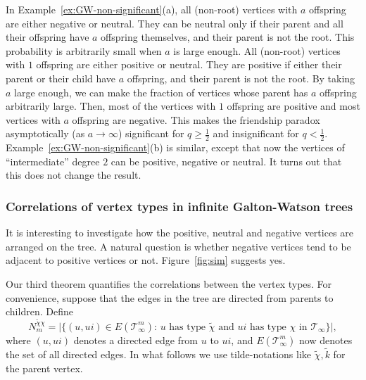 \documentclass[11pt]{article}
\numberwithin{equation}{section}
\theoremstyle{plain}
\newcommand{\tk}{\tilde{k}}
\newcommand{\tchi}{{\tilde{\chi}}}
\begin{document}
In Example~\ref{ex:GW-non-significant}(a), all (non-root) vertices with $a$ offspring are either negative or neutral. They can be neutral only if their parent and all their offspring have $a$ offspring themselves, and their parent is not the root. This probability is arbitrarily small when $a$ is large enough. All (non-root) vertices with $1$ offspring are either positive or neutral. They are positive if either their parent or their child have $a$ offspring, and their parent is not the root. By taking $a$ large enough, we can make the fraction of vertices whose parent has $a$ offspring arbitrarily large. Then, most of the vertices with $1$ offspring are positive and most vertices with $a$ offspring are negative. This makes the friendship paradox asymptotically (as $a\to\infty$) significant for $q \geq \tfrac12$ and insignificant for $q < \tfrac12$. Example~\ref{ex:GW-non-significant}(b) is similar, except that now the vertices of ``intermediate'' degree $2$ can be positive, negative or neutral. It turns out that this does not change the result.


\subsubsection{Correlations of vertex types in infinite Galton-Watson trees}

It is interesting to investigate how the positive, neutral and negative vertices are arranged on the tree. A natural question is whether negative vertices tend to be adjacent to positive vertices or not. Figure~\ref{fig:sim} suggests yes. 

Our third theorem quantifies the correlations between the vertex types. For convenience, suppose that the edges in the tree are directed from parents to children. Define
\[
N_m^{\tilde{\chi}\chi} = \big|\big\{(u,ui)\in E(\mathcal{T}_\infty^m)\colon\, 
\mbox{$u$ has type $\tchi$ and $ui$ has type $\chi$ in $\mathcal{T}_\infty$}\big\}\big|,
\]
where $(u,ui)$ denotes a directed edge from $u$ to $ui$, and $E(\mathcal{T}_\infty^m)$ now denotes the set of all directed edges. In what follows we use tilde-notations like $\tchi,\tk$ for the parent vertex. 
\end{document}
